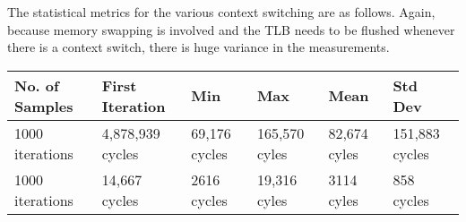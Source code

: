 \documentclass[paper=a4, fontsize=11pt]{scrartcl}
\numberwithin{equation}{section}        %
\numberwithin{figure}{section}          %
\numberwithin{table}{section}               %
\begin{document}
The statistical metrics for the various context switching are as follows.  Again, because memory swapping is involved and the TLB needs to be flushed whenever there is a context switch, there is huge variance in the measurements.

\begin{center}
    \begin{tabular}{ | l | l | l | l | l | l |}
    \hline
    No. of Samples & First Iteration & Min & Max & Mean & Std Dev \\ \hline
    1000 iterations & 4,878,939 cycles & 69,176 cycles & 165,570 cyles & 82,674 cyles & 151,883  cycles \\ 
    1000 iterations & 14,667 cycles & 2616 cycles & 19,316 cyles & 3114 cyles & 858 cycles \\ 
    \hline
    \end{tabular}
\end{center}


\end{document}

